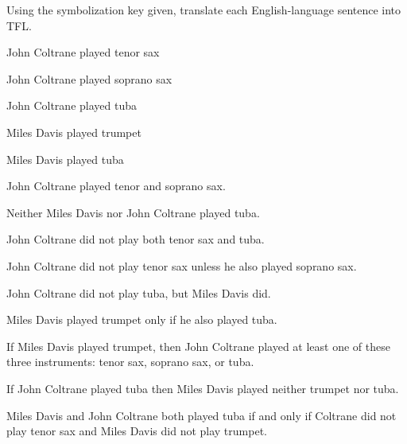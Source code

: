 \problempart
Using the symbolization key given, translate each English-language sentence into TFL.
\label{pr.jazzinstruments}
\begin{ekey}
\item[J_1] John Coltrane played tenor sax
\item[J_2] John Coltrane played soprano sax
\item[J_3] John Coltrane played tuba
\item[M_1] Miles Davis played trumpet
\item[M_2] Miles Davis played tuba
\end{ekey}

\begin{compactlist}
\item John Coltrane played tenor and soprano sax.
\item[~]  
\item Neither Miles Davis nor John Coltrane played tuba.
\item[~] 
\item John Coltrane did not play both tenor sax and tuba.
\item[~]  
\item John Coltrane did not play tenor sax unless he also played soprano sax.
\item[~] 
\item John Coltrane did not play tuba, but Miles Davis did.
\item[~] 
\item Miles Davis played trumpet only if he also played tuba.
\item[~]  
\item If Miles Davis played trumpet, then John Coltrane played at least one of these three instruments: tenor sax, soprano sax, or tuba.
\item[~]  
\item If John Coltrane played tuba then Miles Davis played neither trumpet nor tuba.
\item[~]  
\item Miles Davis and John Coltrane both played tuba if and only if Coltrane did not play tenor sax and Miles Davis did not play trumpet.
\item[~]  
\end{compactlist}

